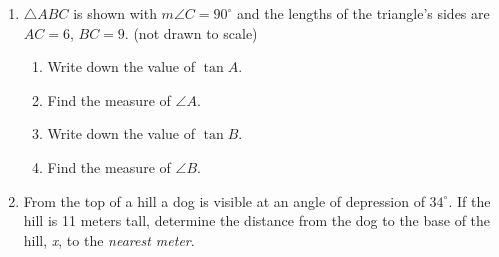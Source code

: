 \documentclass[12pt, twoside]{article}
\begin{document}
\begin{enumerate}
\newpage
\item $\triangle ABC$ is shown with $m\angle C=90^\circ$ and the lengths of the triangle's sides are $AC=6$, $BC=9$.  \hfill (not drawn to scale)
  \begin{multicols}{2}
    \begin{enumerate}
      \item Write down the value of $\tan A$. \vspace{1.25cm}
      \item Find the measure of $\angle A$. \vspace{1cm}
      \item Write down the value of $\tan B$. \vspace{1.25cm}
      \item Find the measure of $\angle B$. \vspace{1cm}
    \end{enumerate}
    \begin{flushright}
    \end{flushright}
  \end{multicols}
  \vspace{2cm}
  

\item From the top of a hill a dog is visible at an angle of depression of $34^\circ$. If the hill is 11 meters tall, determine the distance from the dog to the base of the hill, \emph{x}, to the \emph{nearest meter}.
\begin{flushright}
  \end{flushright} \vspace{4cm}


\end{enumerate}
\end{document}
